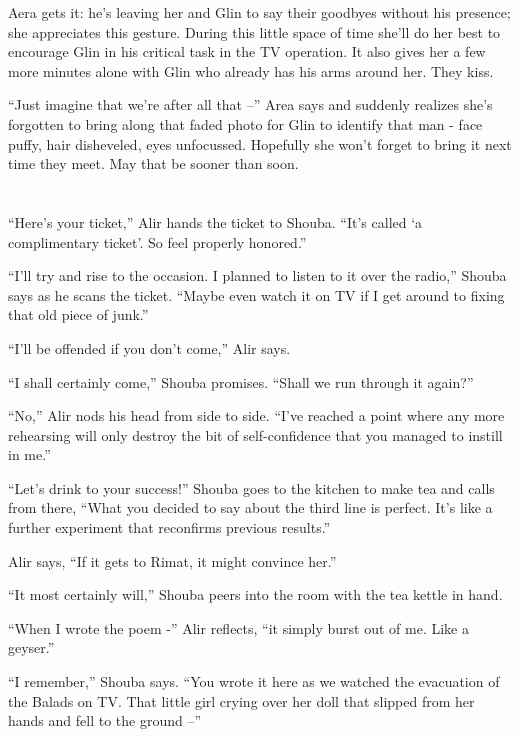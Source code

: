 \documentclass[twoside,11pt]{book}
\begin{document}
Aera gets it: he's leaving her and Glin to say their goodbyes without his presence; she appreciates this gesture.
During this little space of time she'll do her best to encourage Glin in his critical task in the TV operation. It
also gives her a few more minutes alone with Glin who already has his arms around her. They kiss.

``Just imagine that we're after all that --'' Area says and suddenly realizes she's
 forgotten to bring along that faded photo for Glin to identify that man - face puffy, hair disheveled, eyes
unfocussed. Hopefully she won't forget to bring it next time they meet. May that be sooner than soon.



\chapter{}

``Here's your ticket,'' Alir hands the ticket to Shouba. ``It's called `a
complimentary ticket'. So feel properly honored.''

``I'll try and rise to the occasion. I planned to listen to it over the radio,'' Shouba says
as he scans the ticket. ``Maybe even watch it on TV if I get around to fixing that old piece of
junk.''

``I'll be offended if you don't come,'' Alir says.

``I shall certainly come,'' Shouba promises. ``Shall we run through it
again?''

``No,'' Alir nods his head from side to side. ``I've reached a point where any
more rehearsing will only destroy the bit of self-confidence that you managed to instill in me.''

``Let's drink to your success!'' Shouba goes to the kitchen to make tea and calls from there,
``What you decided to say about the third line is perfect. It's like a further experiment that reconfirms
previous results.''

Alir says, ``If it gets to Rimat, it might convince her.''

``It most certainly will,'' Shouba peers into the room with the tea kettle in hand.

``When I wrote the poem -'' Alir reflects, ``it simply burst out of me. Like a geyser.''

``I remember,'' Shouba says. ``You wrote it here as we watched the evacuation of
the Balads on TV. That little girl crying over her doll that slipped from her hands and fell to the ground
--''
\end{document}
